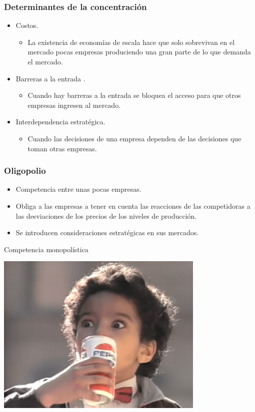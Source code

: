 \documentclass{beamer}
\begin{document}
\begin{frame}
\frametitle{Determinantes de la concentración}
    \begin{itemize}
        \item Costos.
            \begin{itemize}
            \item La existencia de economías de escala hace que solo sobrevivan en el mercado pocas empresas produciendo una gran parte de lo que demanda el mercado. 
            \end{itemize}
        \item Barreras a la entrada .
            \begin{itemize}
            \item Cuando hay barreras a la entrada se bloquea el acceso para que otros empresas ingresen al mercado.
            \end{itemize}
        \item Interdependencia estratégica.
            \begin{itemize}
            \item Cuando las decisiones de una empresa dependen de las decisiones que toman otras empresas. 
            \end{itemize}
    \end{itemize}
\end{frame}

\begin{frame}
\frametitle{Oligopolio}
\begin{itemize}
    \item Competencia entre unas pocas empresas.
    \item Obliga a las empresas a tener en cuenta las reacciones de las competidoras a las desviaciones de los precios de los niveles de producción.
    \item Se introducen consideraciones estratégicas en sus mercados.
\end{itemize}
\end{frame}


\begin{frame}{Competencia monopolística}
\begin{center}
  \href{https://www.youtube.com/watch?v=po0jY4WvCIc}{\includegraphics[width=0.75\textwidth]{../Figures/Diferenciacion (1).png}}
\end{center}
\end{frame}
\end{document}
